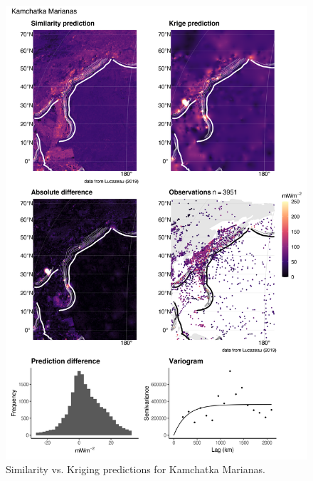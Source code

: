 \documentclass[draft,linenumbers]{agujournal2018}
\begin{document}
\begin{figure}[h]

{\centering \includegraphics[width=0.95\linewidth,]{../figs/diff/comp/Kamchatka_Marianas} 

}

\caption{Similarity vs. Kriging predictions for Kamchatka Marianas.}\label{fig:kamchatka.marianas.comp}
\end{figure}
\end{document}
